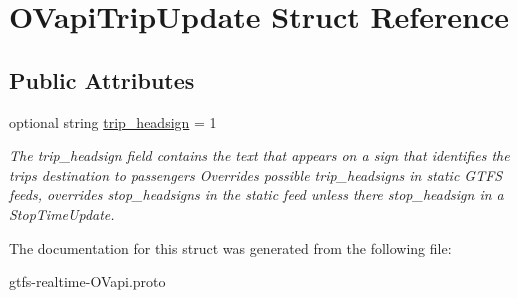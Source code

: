 \hypertarget{structOVapiTripUpdate}{}\section{O\+Vapi\+Trip\+Update Struct Reference}
\label{structOVapiTripUpdate}
\subsection*{Public Attributes}
\begin{DoxyCompactItemize}
\item 
optional string \hyperlink{structOVapiTripUpdate_a81a11f9dbc09e66e41ebec4f34a0f071}{trip\+\_\+headsign} = 1\hypertarget{structOVapiTripUpdate_a81a11f9dbc09e66e41ebec4f34a0f071}{}\label{structOVapiTripUpdate_a81a11f9dbc09e66e41ebec4f34a0f071}

\begin{DoxyCompactList}\small\item\em The trip\+\_\+headsign field contains the text that appears on a sign that identifies the trip\textquotesingle{}s destination to passengers Overrides possible trip\+\_\+headsign\textquotesingle{}s in static G\+T\+FS feeds, overrides stop\+\_\+headsigns in the static feed unless there stop\+\_\+headsign in a Stop\+Time\+Update. \end{DoxyCompactList}\end{DoxyCompactItemize}


The documentation for this struct was generated from the following file\+:\begin{DoxyCompactItemize}
\item 
gtfs-\/realtime-\/\+O\+Vapi.\+proto\end{DoxyCompactItemize}
